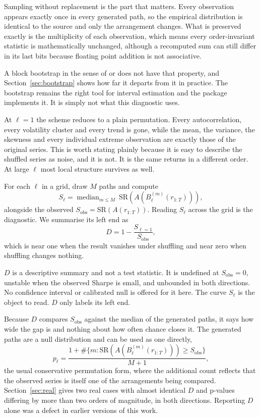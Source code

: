 \documentclass[11pt]{article}
\begin{document}
Sampling without replacement is the part that matters. Every observation appears exactly once in every generated path, so the empirical distribution is identical to the source and only the arrangement changes. What is preserved exactly is the multiplicity of each observation, which means every order-invariant statistic is mathematically unchanged, although a recomputed sum can still differ in its last bits because floating point addition is not associative.

A block bootstrap in the sense of \citet{kunsch1989jackknife} or \citet{politis1994stationary} does not have that property, and Section~\ref{sec:bootstrap} shows how far it departs from it in practice. The bootstrap remains the right tool for interval estimation and the package implements it. It is simply not what this diagnostic uses.

At $\ell = 1$ the scheme reduces to a plain permutation. Every autocorrelation, every volatility cluster and every trend is gone, while the mean, the variance, the skewness and every individual extreme observation are exactly those of the original series. This is worth stating plainly because it is easy to describe the shuffled series as noise, and it is not. It is the same returns in a different order. At large $\ell$ most local structure survives as well.

For each $\ell$ in a grid, draw $M$ paths and compute
\[
  S_\ell = \operatorname{median}_{m \le M}\ \mathrm{SR}\!\left(A\!\left(B_\ell^{(m)}(r_{1:T})\right)\right),
\]
alongside the observed $S_{\mathrm{obs}} = \mathrm{SR}(A(r_{1:T}))$. Reading $S_\ell$ across the grid is the diagnostic. We summarise its left end as
\begin{equation}
  D = 1 - \frac{S_{\ell=1}}{S_{\mathrm{obs}}},
  \label{eq:dependence}
\end{equation}
which is near one when the result vanishes under shuffling and near zero when shuffling changes nothing.

$D$ is a descriptive summary and not a test statistic. It is undefined at $S_{\mathrm{obs}} = 0$, unstable when the observed Sharpe is small, and unbounded in both directions. No confidence interval or calibrated null is offered for it here. The curve $S_\ell$ is the object to read. $D$ only labels its left end.

Because $D$ compares $S_{\mathrm{obs}}$ against the median of the generated paths, it says how wide the gap is and nothing about how often chance closes it. The generated paths are a null distribution and can be used as one directly,
\begin{equation}
  p_\ell = \frac{1 + \#\{m : \mathrm{SR}(A(B_\ell^{(m)}(r_{1:T}))) \ge S_{\mathrm{obs}}\}}{M + 1},
  \label{eq:pvalue}
\end{equation}
the usual conservative permutation form, where the additional count reflects that the observed series is itself one of the arrangements being compared. Section~\ref{sec:real} gives two real cases with almost identical $D$ and p-values differing by more than two orders of magnitude, in both directions. Reporting $D$ alone was a defect in earlier versions of this work.
\end{document}
